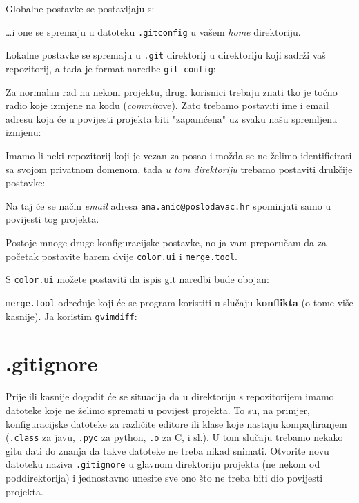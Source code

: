 Globalne postavke se postavljaju s:


\dots{}i one se spremaju u datoteku \verb+.gitconfig+ u vašem \emph{home} direktoriju.

Lokalne postavke se spremaju u \verb+.git+ direktorij u direktoriju koji sadrži vaš repozitorij, a tada je format naredbe \verb+git config+:


Za normalan rad na nekom projektu, drugi korisnici trebaju znati tko je točno radio koje izmjene na kodu (\emph{commit}ove).
Zato trebamo postaviti ime i email adresu koja će u povijesti projekta biti "zapamćena" uz svaku našu spremljenu izmjenu:



Imamo li neki repozitorij koji je vezan za posao i možda se ne želimo identificirati sa svojom privatnom domenom, tada \emph{u tom direktoriju} trebamo postaviti drukčije postavke:



Na taj će se način \emph{email} adresa \verb+ana.anic@poslodavac.hr+ spominjati samo u povijesti tog projekta.

Postoje mnoge druge konfiguracijske postavke, no ja vam preporučam da za početak postavite barem dvije \verb+color.ui+ i \verb+merge.tool+.

S \verb+color.ui+ možete postaviti da ispis git naredbi bude obojan:



\verb+merge.tool+ određuje koji će se program koristiti u slučaju \textbf{konflikta} (o tome više kasnije). Ja koristim \verb+gvimdiff+:



\section*{.gitignore}

Prije ili kasnije dogodit će se situacija da u direktoriju s repozitorijem imamo datoteke koje ne želimo spremati u povijest projekta.
To su, na primjer, konfiguracijske datoteke za različite editore ili klase koje nastaju kompajliranjem (\verb+.class+ za javu, \verb+.pyc+ za python, \verb+.o+ za C, i sl.).
U tom slučaju trebamo nekako gitu dati do znanja da takve datoteke ne treba nikad snimati.
Otvorite novu datoteku naziva \verb+.gitignore+ u glavnom direktoriju projekta (ne nekom od poddirektorija) i jednostavno unesite sve ono što ne treba biti dio povijesti projekta.

